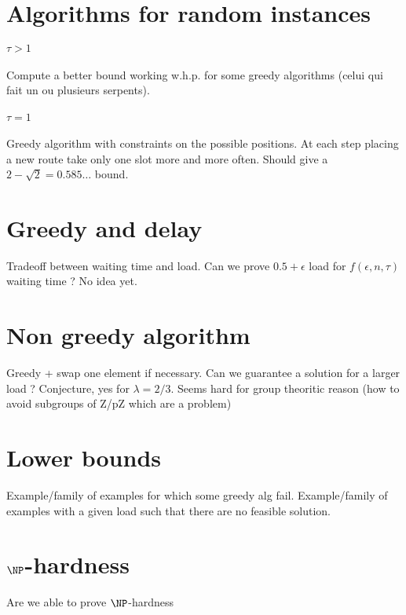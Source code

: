 \documentclass[10pt, conference, letterpaper]{IEEEtran}
\begin{document}
\section{Algorithms for random instances}

\paragraph{$\tau > 1$}
Compute a better bound working w.h.p. for some greedy algorithms (celui qui fait un ou plusieurs serpents). 

\paragraph{$\tau = 1$}

Greedy algorithm with constraints on the possible positions. 
At each step placing a new route take only one slot more and more often. 
Should give a $2 - \sqrt{2} = 0.585\dots$ bound.

\section{Greedy and delay}

Tradeoff between waiting time and load. Can we prove $0.5 + \epsilon$ load for $f(\epsilon,n,\tau)$ waiting time ?  No idea yet.


\section{Non greedy algorithm}

Greedy + swap one element if necessary. 
Can we guarantee a solution for a larger load ? Conjecture, yes for $\lambda = 2/3$. 
Seems hard for group theoritic reason (how to avoid subgroups of Z/pZ which are a problem)

\section{Lower bounds}

Example/family of examples for which some greedy alg fail.
Example/family of examples with a given load such that there are no feasible solution.

\section{$\NP$-hardness}

Are we able to prove $\NP$-hardness

% 
% 
\end{document}
